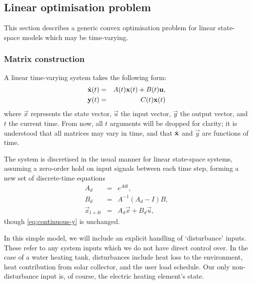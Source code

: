 \subsection{Linear optimisation problem}

This section describes a generic convex optimisation problem for linear state-space models which may be time-varying.

\subsubsection{Matrix construction}

A linear time-varying system takes the following form:
\begin{eqnarray}
   \label{eq:continuous-xdot}
   \dot{\mathbf{x}}(t) &=& A(t) \mathbf{x}(t) + B(t) \mathbf{u}, \\
   \label{eq:continuous-y}
   \mathbf{y}(t) &=& C(t) \mathbf{x}(t)
\end{eqnarray}
where $\vec{x}$ represents the state vector, $\vec{u}$ the input vector, $\vec{y}$ the output vector, and $t$ the current time.
From now, all $t$ arguments will be dropped for clarity; it is understood that all matrices may vary in time, and that $\dot{\mathbf{x}}$ and $\vec{y}$ are functions of time.

The system is discretised in the usual manner for linear state-space systems, assuming a zero-order hold on input signals between each time step, forming a new set of discrete-time equations
\begin{eqnarray}
   \label{eq:discretise-A}
   A_d &=& e^{A \delta t}, \\
   \label{eq:discretise-B}
   B_d &=& A^{-1} (A_d - I) B, \\
   \label{eq:discrete-xdot}
   \vec{x}_{t + \delta t} &=& A_d \vec{x} + B_d \vec{u},
\end{eqnarray}
though \autoref{eq:continuous-y} is unchanged.

In this simple model, we will include an explicit handling of `disturbance' inputs.
These refer to any system inputs which we do not have direct control over.
In the case of a water heating tank, disturbances include heat loss to the environment, heat contribution from solar collector, and the user load schedule.
Our only non-disturbance input is, of course, the electric heating element's state.

